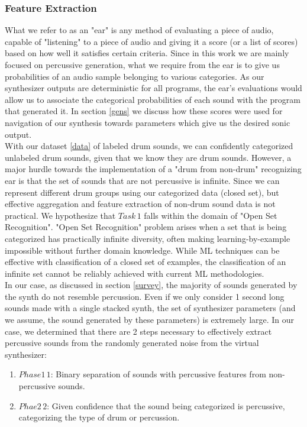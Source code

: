 \documentclass{nime-alternate} %
\begin{document}
\subsubsection{Feature Extraction}
What we refer to as an "ear" is any method of evaluating a piece of audio, capable of "listening" to a piece of audio and giving it a score (or a list of scores) based on how well it satisfies certain criteria. Since in this work we are mainly focused on percussive generation, what we require from the ear is to give us probabilities of an audio sample belonging to various categories. As our synthesizer outputs are deterministic for all programs, the ear's evaluations would allow us to associate the categorical probabilities of each sound with the program that generated it. In section \ref{gens} we discuss how these scores were used for navigation of our synthesis towards parameters which give us the desired sonic output.\\
 With our dataset \ref{data} of labeled drum sounds, we can confidently categorized unlabeled drum sounds, given that we know they are drum sounds. However, a major hurdle towards the implementation of a "drum from non-drum" recognizing ear is that the set of sounds that are not percussive is infinite. Since we can represent different drum groups using our categorized data (closed set), but effective aggregation and feature extraction of non-drum sound data is not practical. We hypothesize that $Task\,1$ falls within the domain of "Open Set Recognition"\cite{scheirer2012toward}. "Open Set Recognition" problem arises when a set that is being categorized has practically infinite diversity, often making learning-by-example impossible without further domain knowledge. While ML techniques can be effective with classification of a closed set of examples, the classification of an infinite set cannot be reliably achieved with current ML methodologies\cite{geng2018recent,mundt2019open}. \\
  In our case, as discussed in section \ref{survey}, the majority of sounds generated by the synth do not resemble percussion. Even if we only consider 1 second long sounds made with a single stacked synth, the set of synthesizer parameters (and we assume, the sound generated by these parameters) is extremely large. In our case, we determined that there are 2 steps necessary to effectively extract percussive sounds from the randomly generated noise from the virtual synthesizer: 
  \begin{enumerate}
   \item  $Phase1\,1$: Binary separation of sounds with percussive features from non-percussive sounds.
   \item $Phae2\,2$: Given confidence that the sound being categorized is percussive, categorizing the type of drum or percussion.
 \end{enumerate}
\end{document}
